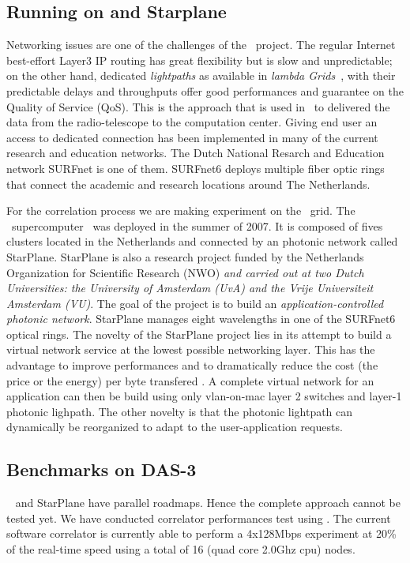 \subsection{Running \scarie on  and Starplane}
Networking issues are one of the challenges of the \scarie\ project.
The regular Internet best-effort Layer3
IP routing has great flexibility but is slow and unpredictable; on the
other hand, dedicated \textit{lightpaths} as available in
\textit{lambda Grids}~\cite{eslea-2007}, with their predictable delays
and throughputs offer good performances and guarantee on the Quality
of Service (QoS). This is the approach that is used in \scarie\ to
delivered the data from the radio-telescope to the computation center.
Giving end user an access to dedicated connection has been implemented
in many of the current research and education networks. The Dutch
National Resarch and Education network SURFnet is one of them.
SURFnet6 deploys multiple fiber optic rings that connect the academic
and research locations around The Netherlands.

For the correlation process we are making experiment on the \
grid. The \ supercomputer~\cite{das3} was
deployed in the summer of 2007. It is composed of fives clusters
located in the Netherlands and connected by an photonic network called
StarPlane. StarPlane is also a research project funded by the
Netherlands Organization for Scientific Research (NWO) \emph{and
  carried out at two Dutch Universities: the University of Amsterdam
  (UvA) and the Vrije Universiteit Amsterdam (VU)}\maginpar{NGHK:
  needed}. The goal of the project is to build an
\textit{application-controlled photonic network}. StarPlane manages
eight wavelengths in one of the SURFnet6 optical rings. The novelty of
the StarPlane project lies in its attempt to build a virtual network
service at the lowest possible networking layer. This has the
advantage to improve performances and to dramatically reduce the cost
(the price or the energy) per byte transfered \cite{}\marginpar{TODO}.
A complete virtual network for an application can then be build using
only vlan-on-mac layer 2 switches and layer-1 photonic lighpath. The
other novelty is that the photonic lightpath can dynamically be
reorganized to adapt to the user-application requests.


\subsection{Benchmarks on DAS-3}
\scarie~ and StarPlane have parallel roadmaps. Hence the complete
approach cannot be tested yet. We have conducted correlator
performances test using . The current software correlator is
currently able to perform a 4x128Mbps experiment at 20\% of the
real-time speed using a total of 16 (quad core 2.0Ghz cpu) nodes.

